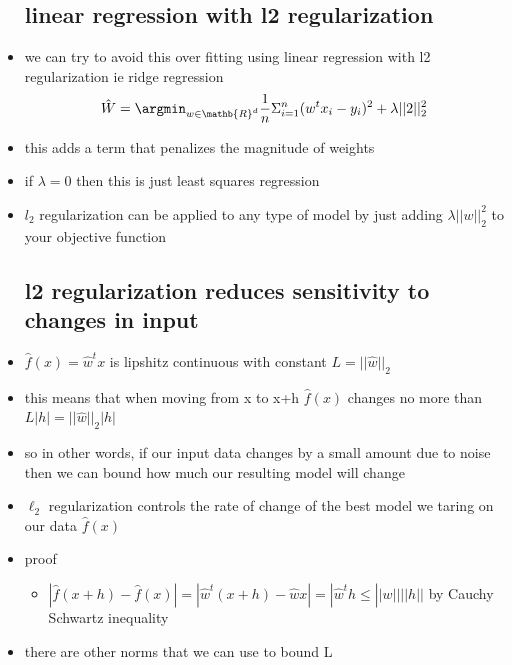 \documentclass{article}
\begin{document}
\begin{itemize}
\subsection{linear regression with l2 regularization}
\item we can try to avoid this over fitting using linear regression with l2 regularization ie ridge regression $$\hat{W}=\argmin_{w\in \mathb{R}^{d}}\frac{1}{n}\Sigma_{i=1}^{n}(w^tx_i-y_i)^2+\lambda||2||_{2}^{2}$$
\item this adds a term that penalizes the magnitude of weights
\item if $\lambda=0$ then this is just least squares regression 
\item $l_2$ regularization can be applied to any type of model by just adding $\lambda||w||_{2}^{2}$ to your objective function 
\subsection{l2 regularization reduces sensitivity to changes in input}
\item $\hat{f}(x)=\hat{w}^{t}x$ is lipshitz continuous with constant $L=||\hat{w}||_{2}$
\item this means that when moving from x to x+h $\hat{f}(x)$ changes no more than $L|h|=||\hat{w}||_{2}|h|$
\item so in other words, if our input data changes by a small amount due to noise then we can bound how much our resulting model will change
\item $\ell_{2}$ regularization controls the rate of change of the best model we taring on our data $\hat{f}(x)$
\item proof
\begin{itemize}
\item $|\hat{f}(x+h)-\hat{f}(x)|=|\hat{w}^{t}(x+h)-\hat{w}x|=|\hat{w}^{t}h\leq ||w|| ||h||$ by Cauchy Schwartz inequality
\end{itemize}
\item there are other norms that we can use to bound L 

\end{itemize}
\end{document}
